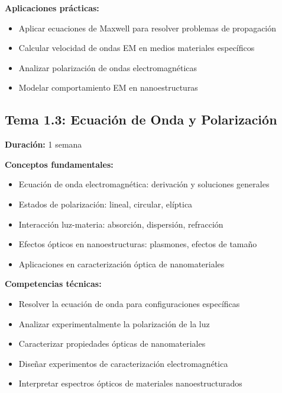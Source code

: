 \documentclass[12pt,a4paper]{book}
\begin{document}
\begin{saberhacerbox}
\textbf{Aplicaciones prácticas:}
\begin{itemize}
\item Aplicar ecuaciones de Maxwell para resolver problemas de propagación
\item Calcular velocidad de ondas EM en medios materiales específicos
\item Analizar polarización de ondas electromagnéticas
\item Modelar comportamiento EM en nanoestructuras
\end{itemize}
\end{saberhacerbox}

\subsection{Tema 1.3: Ecuación de Onda y Polarización}
\textbf{Duración:} 1 semana

\begin{saberbox}
\textbf{Conceptos fundamentales:}
\begin{itemize}
\item Ecuación de onda electromagnética: derivación y soluciones generales
\item Estados de polarización: lineal, circular, elíptica
\item Interacción luz-materia: absorción, dispersión, refracción
\item Efectos ópticos en nanoestructuras: plasmones, efectos de tamaño
\item Aplicaciones en caracterización óptica de nanomateriales
\end{itemize}
\end{saberbox}

\begin{saberhacerbox}
\textbf{Competencias técnicas:}
\begin{itemize}
\item Resolver la ecuación de onda para configuraciones específicas
\item Analizar experimentalmente la polarización de la luz
\item Caracterizar propiedades ópticas de nanomateriales
\item Diseñar experimentos de caracterización electromagnética
\item Interpretar espectros ópticos de materiales nanoestructurados
\end{itemize}
\end{saberhacerbox}
\end{document}
